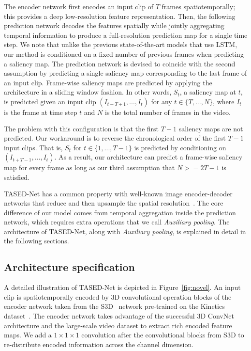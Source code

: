 \documentclass[10pt,twocolumn,letterpaper]{article}
\newcommand{\modelname}{TASED-Net}
\newcommand{\auxpnamet}{Auxiliary pooling}
\newcommand{\auxpname}{\textit{\auxpnamet}}
\begin{document}
  The encoder network first encodes an input clip of $T$ frames spatiotemporally; this provides a deep low-resolution feature representation. Then, the following prediction network decodes the features spatially while jointly aggregating temporal information to produce a full-resolution prediction map for a single time step. We note that unlike the previous state-of-the-art models that use LSTM, our method is conditioned on a fixed number of previous frames when predicting a saliency map. The prediction network is devised to coincide with the second assumption by predicting a single saliency map corresponding to the last frame of an input clip. Frame-wise saliency maps are predicted by applying the architecture in a sliding window fashion. In other words, $S_{t}$, a saliency map at $t$, is predicted given an input clip $(I_{t-T+1},...,I_t)$ for any $t \in \{T,...,N\}$, where $I_t$ is the frame at time step $t$ and $N$ is the total number of frames in the video.
  
  The problem with this configuration is that the first $T-1$ saliency maps are not predicted. Our workaround is to reverse the chronological order of the first $T-1$ input clips. That is, $S_{t}$ for $t \in \{1,...,T-1\}$ is predicted by conditioning on $(I_{t+T-1},...,I_t)$. As a result, our architecture can predict a frame-wise saliency map for every frame as long as our third assumption that $N>=2T-1$ is satisfied. 

 \modelname{} has a common property with well-known image encoder-decoder networks that reduce and then upsample the spatial resolution~\cite{badrinarayanan2015segnet, noh2015learning, ronneberger2015u}. The core difference of our model comes from temporal aggregation inside the prediction network, which requires extra operations that we call \auxpname{}. The architecture of \modelname{}, along with \auxpname{}, is explained in detail in the following sections.

\subsection{Architecture specification} \label{subsec:propose}

A detailed illustration of \modelname{} is depicted in Figure~\ref{fig:novel}. An input clip is spatiotemporally encoded by 3D convolutional operation blocks of the encoder network taken from the S3D~\cite{xie2018rethinking} network pre-trained on the Kinetics dataset~\cite{kay2017kinetics}. The encoder network takes advantage of the successful 3D ConvNet architecture and the large-scale video dataset to extract rich encoded feature maps. We add a $1\times 1\times 1$ convolution after the convolutional blocks from S3D to re-distribute encoded information across the channel dimension.
\end{document}
